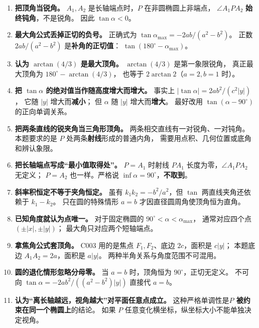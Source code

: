 \begin{trapbox}
\begin{enumerate}
\item \textbf{把顶角当锐角。}
$A_1,A_2$ 是长轴端点时，$P$ 在非圆椭圆上非端点，
$\angle A_1PA_2$ \textbf{始终钝角}，不是锐角。
因此 $\tan\alpha<0$。

\item \textbf{最大角公式丢掉正切的负号。}
正确式为
$\tan\alpha_{\max}=-2ab/(a^2-b^2)$。
正数 $2ab/(a^2-b^2)$ 是\textbf{补角的正切值}：
$\tan(180^\circ-\alpha_{\max})$。

\item \textbf{认为 $\arctan(4/3)$ 是最大顶角。}
$\arctan(4/3)$ 是第一象限锐角，
真正最大顶角为 $180^\circ-\arctan(4/3)$，
也等于 $2\arctan2$（$a=2,b=1$ 时）。

\item \textbf{把 $\tan\alpha$ 的绝对值当作随高度增大而增大。}
事实上
$|\tan\alpha|=2ab^2/(c^2|y|)$，
它随 $|y|$ 增大而\textbf{减小}；
但 $\alpha$ 随 $|y|$ 增大而\textbf{增大}。
最好改用 $\tan(\alpha-90^\circ)$ 的正向单调关系。

\item \textbf{把两条直线的锐夹角当三角形顶角。}
两条相交直线有一对锐角、一对钝角。
本题要求的是 $P$ 处两条\textbf{射线}形成的普通内角，
需要用点积、几何位置或底角和辨认象限。

\item \textbf{把长轴端点写成“最小值取得处”。}
$P=A_1$ 时射线 $PA_1$ 长度为零，$\angle A_1PA_2$ 无定义；
$P=A_2$ 也一样。严格说
$\inf\alpha=90^\circ$，\textbf{不取到}。

\item \textbf{斜率积恒定不等于夹角恒定。}
虽有 $k_1k_2=-b^2/a^2$，但
$\tan$ 两直线夹角还依赖于 $k_1-k_2$。
只在圆的特殊情形 $a=b$ 才因直径圆周角使顶角恒为直角。

\item \textbf{已知角度就认为点唯一。}
对于固定椭圆的 $90^\circ<\alpha<\alpha_{\max}$，
通常对应四个点 $(\pm|x|,\pm|y|)$；
最大角只对应两个短轴端点。

\item \textbf{拿焦角公式套顶角。}
C003 用的是焦点 $F_1,F_2$、底边 $2c$，面积是 $c|y|$；
本题底边 $A_1A_2=2a$，面积是 $a|y|$。
两种半角关系与角度范围不可混用。

\item \textbf{圆的退化情形忽略分母零。}
当 $a=b$ 时，顶角恒为 $90^\circ$，正切无定义。
不可向 $\tan\alpha=-2ab^2/((a^2-b^2)|y|)$ 直接代 $a=b$。

\item \textbf{认为“离长轴越远，视角越大”对平面任意点成立。}
这种严格单调性是\textbf{$P$ 被约束在同一个椭圆上}的结论。
如果 $P$ 任意变化横坐标，纵坐标大小不能单独决定视角。


\end{enumerate}
\end{trapbox}
